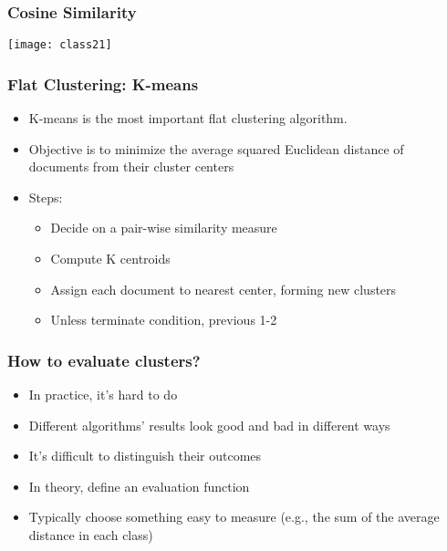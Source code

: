 \begin{frame}[fragile]
  \frametitle{Cosine Similarity}
\begin{center}
\texttt{[image: class21]}
\end{center}
\end{frame}

\begin{frame}[fragile]
  \frametitle{Flat Clustering: K-means}
\begin{itemize}
\item K-means is the most important flat clustering algorithm. 
\item Objective is to minimize the average squared Euclidean distance of documents from their cluster centers
\item Steps:
\begin{itemize}
\item Decide on a pair-wise similarity measure
\item Compute K centroids
\item Assign each document to nearest center, forming new clusters
\item  Unless terminate condition, previous 1-2
\end{itemize}
\end{itemize}
\end{frame}

\begin{frame}[fragile]
  \frametitle{How to evaluate clusters?}
\begin{itemize}
\item In practice, it's hard to do
\item Different algorithms' results look good and bad in different ways
\item It's difficult to distinguish their outcomes
\item In theory, define an evaluation function
\item Typically choose something easy to measure (e.g., the sum of the average distance in each class)
\end{itemize}
\end{frame}